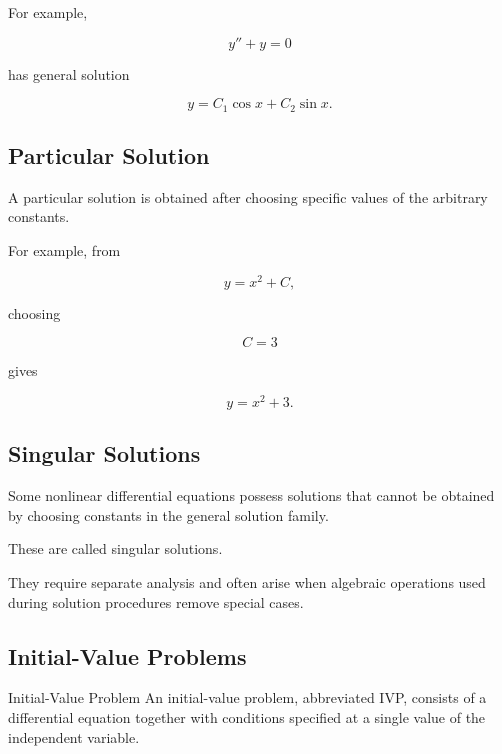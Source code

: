 For example,

\[
\boxed{
y''+y=0
}
\]

has general solution

\[
\boxed{
y
=
C_1\cos x
+
C_2\sin x.
}
\]

\subsection{Particular Solution}
\label{subsec:particular-solution-ode}

A particular solution is obtained after choosing specific values of the
arbitrary constants.

For example, from

\[
y=x^2+C,
\]

choosing

\[
C=3
\]

gives

\[
\boxed{
y=x^2+3.
}
\]

\subsection{Singular Solutions}
\label{subsec:singular-solutions-ode}

Some nonlinear differential equations possess solutions that cannot be
obtained by choosing constants in the general solution family.

These are called singular solutions.

They require separate analysis and often arise when algebraic operations
used during solution procedures remove special cases.

\subsection{Initial-Value Problems}
\label{subsec:initial-value-problems}

\begin{definitionbox}{Initial-Value Problem}
An initial-value problem, abbreviated IVP, consists of a differential
equation together with conditions specified at a single value of the
independent variable.
\end{definitionbox}


